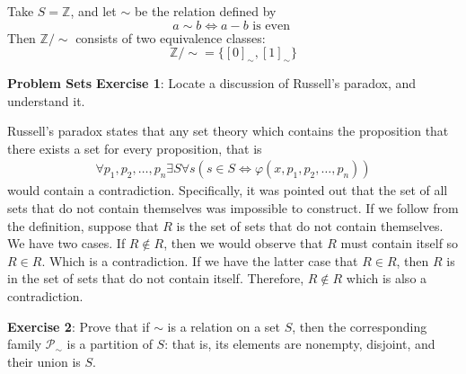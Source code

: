 \documentclass{report}
\begin{document}
\begin{examples}
    \begin{example}[\label{exm:1.1.3}]
        Take $S = \mathbb{Z}$, and let $\sim $ be the relation defined by
            \begin{equation*}
                a \sim b \iff a - b \text{ is even }
            \end{equation*}
        Then $\mathbb{Z}/ \sim $ consists of two equivalence classes:
            \begin{equation*}
                \mathbb{Z} /\sim = \{[0]_{\sim }, [1]_{\sim }\}
            \end{equation*}
    \end{example}
\end{examples}

\begin{exercises}{\textbf{Problem Sets}}
    \textbf{Exercise 1}: Locate a discussion of Russell's paradox, and understand it.

    \begin{answer}
        Russell's paradox states that any set theory which contains the proposition that there exists a set for every proposition, that is
        \begin{align*}
            \forall p_{1}, p_{2}, \ldots, p_{n} \exists S \forall s (s \in S \iff \varphi(x, p_{1}, p_{2}, \ldots, p_{n}))
        \end{align*}
        would contain a contradiction. Specifically, it was pointed out that the set of all sets that do not contain themselves was impossible to construct. If we follow from the definition, suppose that $R$ is the set of sets that do not contain themselves. We have two cases. If $R \notin R$, then we would observe that $R$ must contain itself so $R \in R$. Which is a contradiction. If we have the latter case that $R \in R$, then $R$ is in the set of sets that do not contain itself. Therefore, $R \notin R$ which is also a contradiction.
    \end{answer}

    \textbf{Exercise 2}: Prove that if $\sim $ is a relation on a set $S$, then the corresponding family $\mathcal{P}_{\sim }$ is a partition of $S$: that is, its elements are nonempty, disjoint, and their union is $S$.


\end{exercises}
\end{document}
